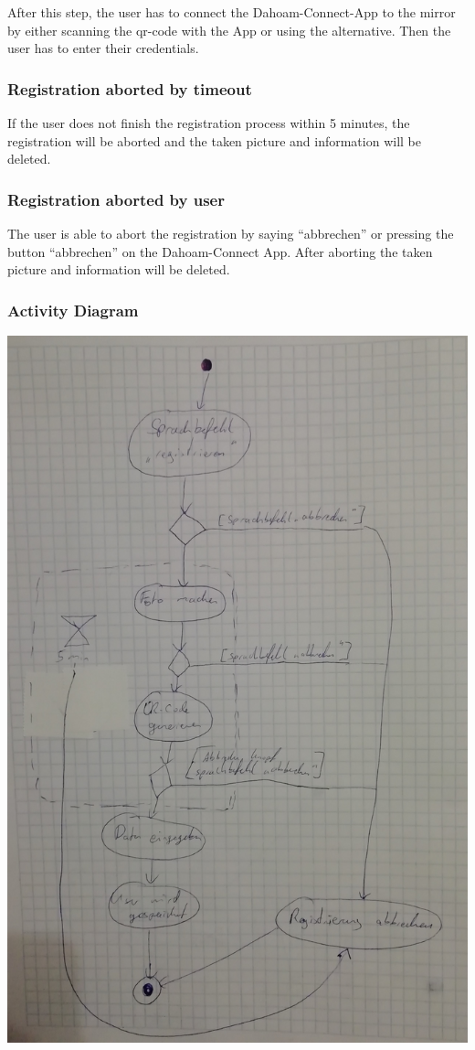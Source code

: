 \documentclass[12pt]{article}
\theoremstyle{definition}
\begin{document}
After this step, the user has to connect the Dahoam-Connect-App to the mirror by either scanning the qr-code with the App or using the alternative. Then the user has to enter their credentials. 

\subsubsection{Registration aborted by timeout}
If the user does not finish the registration process within 5 minutes, the registration will be aborted and the taken picture and information will be deleted.

\subsubsection{Registration aborted by user}
The user is able to abort the registration by saying ``abbrechen'' or pressing the button ``abbrechen'' on the Dahoam-Connect App. After aborting the taken picture and information will be deleted.\\

\subsubsection{Activity Diagram}
\includegraphics[scale=.17]{Activity.jpg}\\
\end{document}
